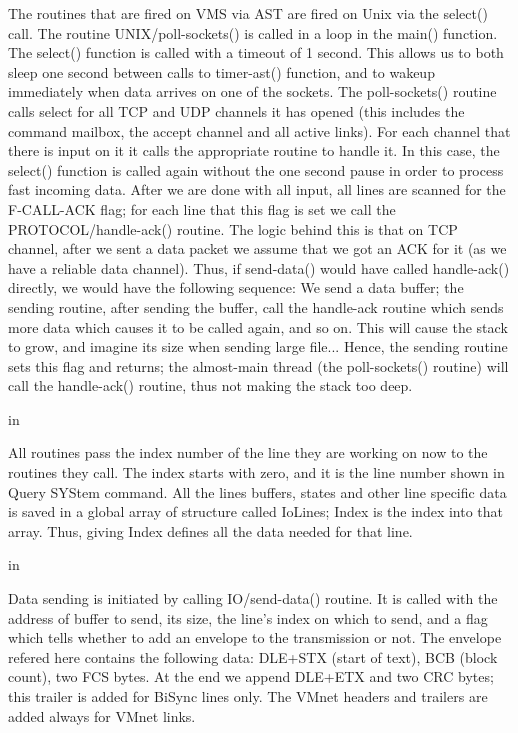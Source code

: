 The routines that are fired on VMS via AST are fired on Unix via  the
select()  call.  The  routine UNIX/poll-sockets() is called in a loop in
the main() function. The select() function is called with a timeout of 1
second.  This  allows  us  to  both  sleep  one  second between calls to
timer-ast() function, and to wakeup immediately when data arrives on one
of  the sockets. The poll-sockets() routine calls select for all TCP and
UDP channels it has opened  (this  includes  the  command  mailbox,  the
accept  channel  and  all  active links). For each channel that there is
input on it it calls the appropriate routine to handle it. In this case,
the  select()  function  is called again without the one second pause in
order to process fast incoming data. After we are done with  all  input,
all  lines  are scanned for the F-CALL-ACK flag; for each line that this
flag is set we call the PROTOCOL/handle-ack() routine. The logic  behind
this  is that on TCP channel, after we sent a data packet we assume that
we got an ACK for it (as we have a  reliable  data  channel).  Thus,  if
send-data()  would  have called handle-ack() directly, we would have the
following sequence: We send a data buffer; the  sending  routine,  after
sending  the  buffer,  call the handle-ack routine which sends more data
which causes it to be called again, and so on. This will cause the stack
to  grow,  and  imagine  its  size when sending large file... Hence, the
sending routine sets this flag and returns; the almost-main thread  (the
poll-sockets()  routine)  will  call  the handle-ack() routine, thus not
making the stack too deep.

 in

All routines pass the index number of the line they  are  working  on
now to the routines they call. The index starts with zero, and it is the
line number shown in Query SYStem command. All the lines buffers, states
and  other  line  specific  data is saved in a global array of structure
called IoLines; Index is the index into that array. Thus,  giving  Index
defines all the data needed for that line.

 in

Data  sending  is  initiated by calling IO/send-data() routine. It is
called with the address of buffer to send, its size, the line's index on
which  to send, and a flag which tells whether to add an envelope to the
transmission or not. The envelope refered here  contains  the  following
data:  DLE+STX (start of text), BCB (block count), two FCS bytes. At the
end we append DLE+ETX and two CRC  bytes;  this  trailer  is  added  for
BiSync  lines  only. The VMnet headers and trailers are added always for
VMnet links.

